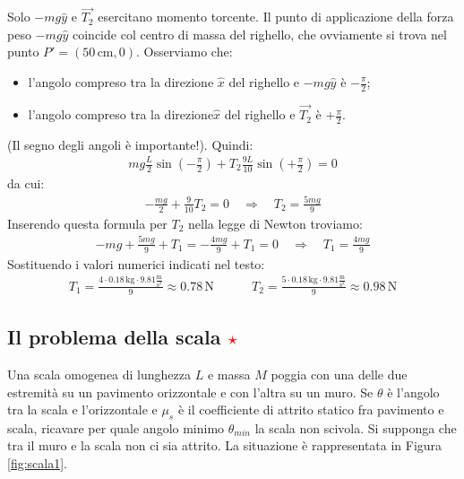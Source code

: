 \documentclass[12pt,a4paper]{book}
\newcommand{\rstar}{ \textcolor{red}{$\star$}}
\begin{document}
Solo $-mg\hat{y}$ e $\vec{T_2}$ esercitano momento torcente. Il punto di applicazione della forza peso $-mg\hat{y}$ coincide col centro di massa
del righello, che ovviamente si trova nel punto $P'=(50\,\text{cm},0)$. Osserviamo che: 
\begin{itemize}
\item l'angolo compreso tra la direzione $\hat{x}$ del righello e $-mg\hat{y}$ è $-\frac{\pi}{2}$;
\item l'angolo compreso tra la direzione$\hat{x}$ del righello e $\vec{T_2}$ è $+\frac{\pi}{2}$. 
\end{itemize} 
(Il segno degli angoli è importante!). Quindi:
\begin{gather*}
mg\frac{L}{2} \sin (-\frac{\pi}{2}) + T_2 \frac{9L}{10} \sin(+\frac{\pi}{2})=0
\end{gather*}
da cui:
\begin{gather*}
-\frac{mg}{2} +  \frac{9}{10}T_2 =0 \quad \Rightarrow \quad T_2=\frac{5mg}{9}
\end{gather*}
Inserendo questa formula per $T_2$ nella legge di Newton troviamo:
\begin{gather*}
-mg+\frac{5mg}{9}+T_1=-\frac{4mg}{9}+T_1=0 \quad \Rightarrow \quad T_1=\frac{4mg}{9}
\end{gather*}
Sostituendo i valori numerici indicati nel testo:
\begin{gather*}
T_1=\frac{4\cdot 0.18\, \text{kg} \cdot 9.81 \frac{\text{m}}{\text{s}^2}}{9}\approx 0.78 \, \text{N} \qquad  \quad  T_2=\frac{5\cdot 0.18\, \text{kg} \cdot 9.81 \frac{\text{m}}{\text{s}^2}}{9} \approx 0.98 \, \text{N}
\end{gather*}

\subsection{Il problema della scala \rstar}
Una scala omogenea di lunghezza $L$ e massa $M$ poggia con una delle due estremità su un pavimento orizzontale e con l'altra
su un muro. Se $\theta$ è l'angolo tra la scala e l'orizzontale e $\mu_s$ è il coefficiente di attrito statico fra pavimento e scala,
ricavare per quale angolo minimo $\theta_{min}$ la scala non scivola. Si supponga che tra il muro e la scala non ci sia attrito.  La situazione 
è rappresentata in Figura \ref{fig:scala1}.
\end{document}
